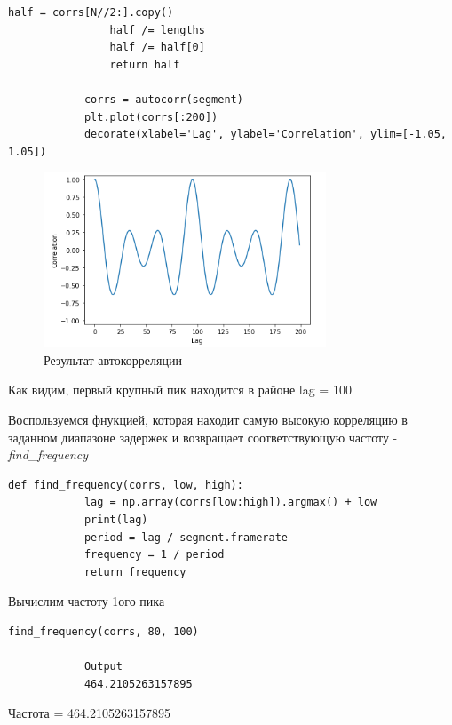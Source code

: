 \documentclass[a4paper,12pt]{article}
\begin{document}
\begin{enumerate}
\begin{lstlisting}[caption=Автокоррелируем]
				half = corrs[N//2:].copy()
				half /= lengths
				half /= half[0]
				return half
				
			corrs = autocorr(segment)
			plt.plot(corrs[:200])
			decorate(xlabel='Lag', ylabel='Correlation', ylim=[-1.05, 1.05])
		\end{lstlisting}
		\begin{figure}[H]
			\centering
			\includegraphics[width=0.75\textwidth]{4_2.png}
			\caption{Результат автокорреляции}
			\label{fig:4.2}
		\end{figure}
		
		Как видим, первый крупный пик находится в районе lag = 100
		
		Воспользуемся фнукцией, которая находит самую высокую корреляцию в заданном диапазоне задержек и возвращает соответствующую частоту - \textit{find\_frequency}
		
		\begin{lstlisting}[caption=Функция \textit{find\_frequency}]
			def find_frequency(corrs, low, high):
			lag = np.array(corrs[low:high]).argmax() + low
			print(lag)
			period = lag / segment.framerate
			frequency = 1 / period
			return frequency
		\end{lstlisting}
		
		Вычислим частоту 1ого пика
		\begin{lstlisting}[caption=Частота первого пика]
			find_frequency(corrs, 80, 100)
			
			Output
			464.2105263157895
		\end{lstlisting}
		Частота = 464.2105263157895
		

\end{enumerate}
\end{document}
